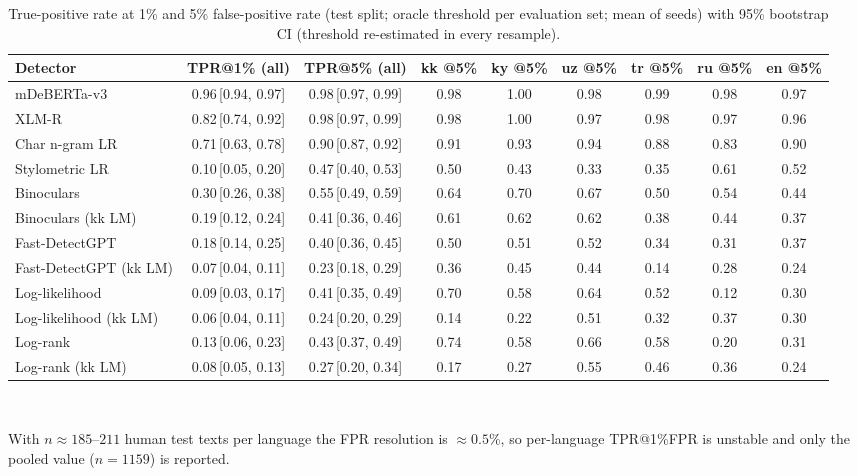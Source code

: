 \begin{table}[t]
\centering
\small
\caption{True-positive rate at 1\% and 5\% false-positive rate (test split; oracle threshold per evaluation set; mean of seeds) with 95\% bootstrap CI (threshold re-estimated in every resample).}
\label{tab:lowfpr}
\begin{tabular}{lcccccccc}
\toprule
Detector & TPR@1\% (all) & TPR@5\% (all) & kk @5\% & ky @5\% & uz @5\% & tr @5\% & ru @5\% & en @5\% \\
\midrule
mDeBERTa-v3 & 0.96\,{\scriptsize[0.94, 0.97]} & 0.98\,{\scriptsize[0.97, 0.99]} & 0.98 & 1.00 & 0.98 & 0.99 & 0.98 & 0.97 \\
XLM-R & 0.82\,{\scriptsize[0.74, 0.92]} & 0.98\,{\scriptsize[0.97, 0.99]} & 0.98 & 1.00 & 0.97 & 0.98 & 0.97 & 0.96 \\
Char n-gram LR & 0.71\,{\scriptsize[0.63, 0.78]} & 0.90\,{\scriptsize[0.87, 0.92]} & 0.91 & 0.93 & 0.94 & 0.88 & 0.83 & 0.90 \\
Stylometric LR & 0.10\,{\scriptsize[0.05, 0.20]} & 0.47\,{\scriptsize[0.40, 0.53]} & 0.50 & 0.43 & 0.33 & 0.35 & 0.61 & 0.52 \\
Binoculars & 0.30\,{\scriptsize[0.26, 0.38]} & 0.55\,{\scriptsize[0.49, 0.59]} & 0.64 & 0.70 & 0.67 & 0.50 & 0.54 & 0.44 \\
Binoculars (kk LM) & 0.19\,{\scriptsize[0.12, 0.24]} & 0.41\,{\scriptsize[0.36, 0.46]} & 0.61 & 0.62 & 0.62 & 0.38 & 0.44 & 0.37 \\
Fast-DetectGPT & 0.18\,{\scriptsize[0.14, 0.25]} & 0.40\,{\scriptsize[0.36, 0.45]} & 0.50 & 0.51 & 0.52 & 0.34 & 0.31 & 0.37 \\
Fast-DetectGPT (kk LM) & 0.07\,{\scriptsize[0.04, 0.11]} & 0.23\,{\scriptsize[0.18, 0.29]} & 0.36 & 0.45 & 0.44 & 0.14 & 0.28 & 0.24 \\
Log-likelihood & 0.09\,{\scriptsize[0.03, 0.17]} & 0.41\,{\scriptsize[0.35, 0.49]} & 0.70 & 0.58 & 0.64 & 0.52 & 0.12 & 0.30 \\
Log-likelihood (kk LM) & 0.06\,{\scriptsize[0.04, 0.11]} & 0.24\,{\scriptsize[0.20, 0.29]} & 0.14 & 0.22 & 0.51 & 0.32 & 0.37 & 0.30 \\
Log-rank & 0.13\,{\scriptsize[0.06, 0.23]} & 0.43\,{\scriptsize[0.37, 0.49]} & 0.74 & 0.58 & 0.66 & 0.58 & 0.20 & 0.31 \\
Log-rank (kk LM) & 0.08\,{\scriptsize[0.05, 0.13]} & 0.27\,{\scriptsize[0.20, 0.34]} & 0.17 & 0.27 & 0.55 & 0.46 & 0.36 & 0.24 \\
\bottomrule
\end{tabular}
\\[2pt]\parbox{\linewidth}{\footnotesize With $n\approx185$--$211$ human test texts per language the FPR resolution is $\approx0.5$\%, so per-language TPR@1\%FPR is unstable and only the pooled value ($n=1159$) is reported.}
\end{table}